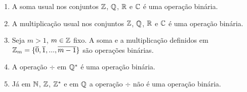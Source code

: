 \documentclass{beamer}
\begin{document}
    \begin{frame}
        \begin{exemplos}
            \begin{enumerate}[label={\arabic*})]
                \item A soma usual nos conjuntos $\mathbb{Z}$, $\mathbb{Q}$, $\mathbb{R}$ e $\mathbb{C}$ {\'e} uma opera{\c c}{\~a}o bin{\'a}ria.

                \vspace{.3cm}

                \item A multiplica\c{c}\~ao usual nos conjuntos $\mathbb{Z}$, $\mathbb{Q}$, $\mathbb{R}$ e $\mathbb{C}$ {\'e} uma opera{\c c}{\~a}o bin{\'a}ria.

                \vspace{.3cm}

                \item Seja $m > 1$, $m \in \mathbb{Z}$ fixo. A soma e a multiplica\c{c}\~ao definidos em $\mathbb{Z}_m = \{\overline{0},\overline{1},...,\overline{m-1}\}$ são opera\c{c}ões bin\'arias.
                
                \vspace{.3cm}

                \item A opera\c{c}\~ao $\div$ em $\mathbb{Q}^{*}$ {\'e} uma opera{\c c}{\~a}o bin{\'a}ria.
                
                \vspace{.3cm}

                \item J\'a em $\mathbb{N}$, $\mathbb{Z}$, $\mathbb{Z}^{*}$ e em $\mathbb{Q}$ a opera\c{c}\~ao $\div$ n{\~a}o {\'e} uma opera{\c c}{\~a}o bin{\'a}ria.
                
                \vspace{.3cm}

            \end{enumerate}
        \end{exemplos}
    \end{frame}
\end{document}
